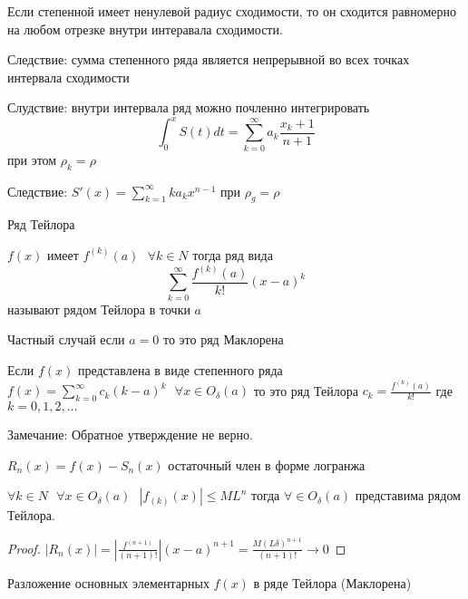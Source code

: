 \begin{theorem}
  Если степенной имеет ненулевой радиус сходимости, то он сходится равномерно
  на любом отрезке внутри интеравала сходимости.
\end{theorem}

Следствие: сумма степенного ряда является непрерывной во всех точках интервала
сходимости

Слудствие: внутри интервала ряд можно почленно интегрировать
$$
\int_0^x S(t)dt = \sum_{k=0}^{\infty} a_k \frac{x_k+1}{n+1}
$$
при этом $\rho_k = \rho$

Следствие: $S'(x) = \sum_{k=1}^{\infty}k a_k x^{n-1}$ при $\rho_g = \rho$

\begin{title}
  Ряд Тейлора
\end{title}

\begin{define}
  $f(x)$ имеет $f^{(k)}(a) ~~~ \forall k \in N$ тогда ряд вида
  $$
  \sum_{k=0}^{\infty} \frac{f^{(k)}(a)}{k!} (x-a)^k
  $$
  называют рядом Тейлора в точки $a$

  Частный случай если $a = 0$ то это ряд Маклорена
\end{define}

\begin{theorem}
  Если $f(x)$ представлена в виде степенного ряда $f(x) = \sum_{k=0}^{\infty}
  c_k(k-a)^k ~~~ \forall x \in O_{\delta}(a)$ то это ряд Тейлора
  $c_k = \frac{f^{(k)}(a)}{k!}$ где $k = 0,1,2, \ldots$
\end{theorem}

Замечание: Обратное утверждение не верно.

\begin{define}
  $R_n(x) = f(x) - S_n(x)$ остаточный член в форме логранжа
\end{define}

\begin{theorem}
  $\forall k \in N ~~~ \forall x \in O_{\delta}(a) ~~~ |f_{(k)}(x)| \le M L^n$
  тогда $\forall \in O_{\delta}(a)$ представима рядом Тейлора.
\end{theorem}

\begin{proof}
  $|R_n(x)| = \left| \frac{f^{(n+1)}}{(n+1)!} \right| (x-a)^{n+1} =
  \frac{ M (L\delta)^{n+1} }{(n+1)!} \to 0$
\end{proof}

\begin{title}
  Разложение основных элементарных $f(x)$ в ряде Тейлора (Маклорена)
\end{title}